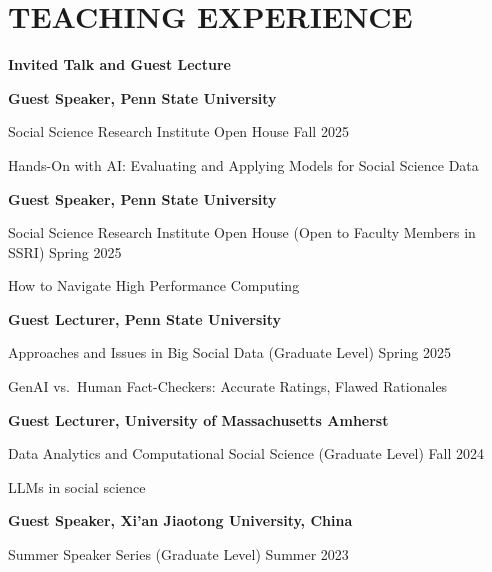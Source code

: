 \documentclass[10.5pt,]{article}
\providecommand{\tightlist}{%
	\setlength{\itemsep}{0pt}\setlength{\parskip}{0pt}}
\renewenvironment{itemize}{
	\begin{list}{}{
			\setlength{\leftmargin}{1.5em}
		}
	}{
	\end{list}
}
\begin{document}
\section{TEACHING EXPERIENCE}\label{teaching-experience}

\begin{itemize}
\tightlist
\item
  \textbf{Invited Talk and Guest Lecture}

  \begin{itemize}
  \tightlist
  \item
    \textbf{Guest Speaker, Penn State University}
  \item
    Social Science Research Institute Open House \hfill Fall 2025

    \begin{itemize}
    \tightlist
    \item
      Hands-On with AI: Evaluating and Applying Models for Social
      Science Data
    \end{itemize}
  \item
    \textbf{Guest Speaker, Penn State University}
  \item
    Social Science Research Institute Open House (Open to Faculty
    Members in SSRI) \hfill Spring 2025

    \begin{itemize}
    \tightlist
    \item
      How to Navigate High Performance Computing
    \end{itemize}
  \item
    \textbf{Guest Lecturer, Penn State University}
  \item
    Approaches and Issues in Big Social Data (Graduate Level)
    \hfill Spring 2025

    \begin{itemize}
    \tightlist
    \item
      GenAI vs.~Human Fact-Checkers: Accurate Ratings, Flawed Rationales
    \end{itemize}
  \item
    \textbf{Guest Lecturer, University of Massachusetts Amherst}
  \item
    Data Analytics and Computational Social Science (Graduate Level)
    \hfill Fall 2024

    \begin{itemize}
    \tightlist
    \item
      LLMs in social science
    \end{itemize}
  \item
    \textbf{Guest Speaker, Xi'an Jiaotong University, China}
  \item
    Summer Speaker Series (Graduate Level) \hfill Summer 2023


\end{itemize}
\end{itemize}
\end{document}
